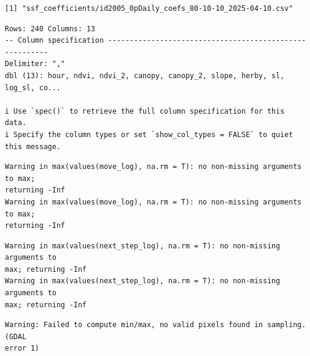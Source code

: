 \documentclass[
  letterpaper,
  DIV=11,
  numbers=noendperiod]{scrartcl}
\newenvironment{Shaded}{\begin{snugshade}}{\end{snugshade}}
\newcommand{\CommentTok}[1]{\textcolor[rgb]{0.37,0.37,0.37}{#1}}
\newcommand{\FunctionTok}[1]{\textcolor[rgb]{0.28,0.35,0.67}{#1}}
\newcommand{\NormalTok}[1]{\textcolor[rgb]{0.00,0.23,0.31}{#1}}
\newcommand{\SpecialCharTok}[1]{\textcolor[rgb]{0.37,0.37,0.37}{#1}}
\begin{document}
\begin{Shaded}
\end{Shaded}

\begin{verbatim}
[1] "ssf_coefficients/id2005_0pDaily_coefs_80-10-10_2025-04-10.csv"
\end{verbatim}

\begin{verbatim}
Rows: 240 Columns: 13
-- Column specification --------------------------------------------------------
Delimiter: ","
dbl (13): hour, ndvi, ndvi_2, canopy, canopy_2, slope, herby, sl, log_sl, co...

i Use `spec()` to retrieve the full column specification for this data.
i Specify the column types or set `show_col_types = FALSE` to quiet this message.
\end{verbatim}

\begin{verbatim}
Warning in max(values(move_log), na.rm = T): no non-missing arguments to max;
returning -Inf
Warning in max(values(move_log), na.rm = T): no non-missing arguments to max;
returning -Inf
\end{verbatim}

\begin{verbatim}
Warning in max(values(next_step_log), na.rm = T): no non-missing arguments to
max; returning -Inf
Warning in max(values(next_step_log), na.rm = T): no non-missing arguments to
max; returning -Inf
\end{verbatim}

\begin{verbatim}
Warning: Failed to compute min/max, no valid pixels found in sampling. (GDAL
error 1)
\end{verbatim}
\end{document}
